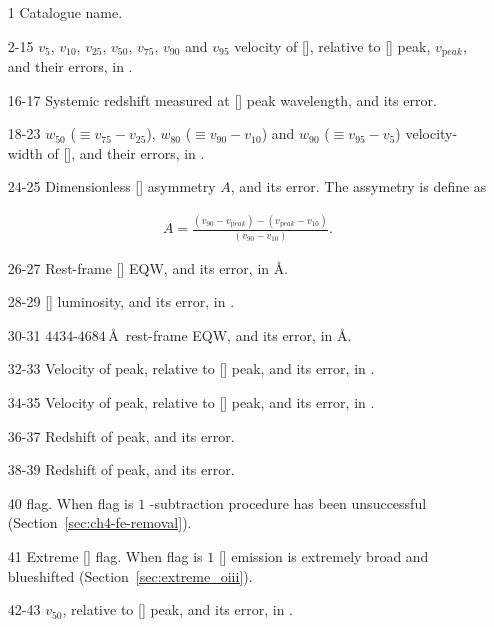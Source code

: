 \begin{itemize}
    
  \item[1] Catalogue name. 

  \item[2-15] $v_{5}$, $v_{10}$, $v_{25}$, $v_{50}$, $v_{75}$, $v_{90}$ and $v_{95}$ velocity of [], relative to [] peak, $v_{\mathrm peak}$, and their errors, in \kms.  

  \item[16-17] Systemic redshift measured at [] peak wavelength, and its error. 

  \item[18-23] $w_{50}$ ($\equiv v_{75} - v_{25}$), $w_{80}$ ($\equiv v_{90} - v_{10}$) and $w_{90}$ ($\equiv v_{95} - v_{5}$) velocity-width of [], and their errors, in \kms.

  \item[24-25] Dimensionless [] asymmetry $A$, and its error. The assymetry is define as 

  \begingroup\makeatletter{}\check@mathfonts
   \begin{eqnarray}
    A = \frac{(v_{90} - v_{\mathrm peak}) - (v_{\mathrm peak} - v_{10})}{(v_{90} - v_{10})}.     
    \end{eqnarray}  
  \endgroup

  \item[26-27] Rest-frame [] EQW, and its error, in \AA.

  \item[28-29] [\ion{O}{III}] luminosity, and its error, in \ergs. 

  \item[30-31] $4434$-$4684$\,\AA\, rest-frame  EQW, and its error, in \AA.  

  \item[32-33] Velocity of \hb peak, relative to [] peak, and its error, in \kms. 

  \item[34-35] Velocity of \ha peak, relative to [] peak, and its error, in \kms. 

  \item[36-37] Redshift of \hb peak, and its error.

  \item[38-39] Redshift of \ha peak, and its error.

  \item[40]  flag. When flag is $1$ -subtraction procedure has been unsuccessful (Section~\ref{sec:ch4-fe-removal}).  

  \item[41] Extreme [] flag. When flag is $1$ [] emission is extremely broad and blueshifted (Section~\ref{sec:extreme_oiii}). 

  \item[42-43]  $v_{50}$, relative to [] peak, and its error, in \kms.

\end{itemize}

